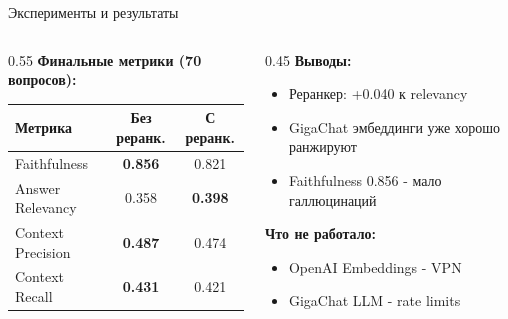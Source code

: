 \documentclass[aspectratio=169,12pt]{beamer}
\begin{document}
\begin{frame}{Эксперименты и результаты}

\begin{columns}
\begin{column}{0.55\textwidth}
\textbf{Финальные метрики (70 вопросов):}

\begin{table}
\centering
\begin{tabular}{lcc}
\toprule
Метрика & Без реранк. & С реранк. \\
\midrule
Faithfulness & \textbf{0.856} & 0.821 \\
Answer Relevancy & 0.358 & \textbf{0.398} \\
Context Precision & \textbf{0.487} & 0.474 \\
Context Recall & \textbf{0.431} & 0.421 \\
\bottomrule
\end{tabular}
\end{table}
\end{column}

\begin{column}{0.45\textwidth}
\textbf{Выводы:}
\begin{itemize}
    \item Реранкер: +0.040 к relevancy
    \item GigaChat эмбеддинги уже хорошо ранжируют
    \item Faithfulness 0.856 - мало галлюцинаций
\end{itemize}

\vspace{0.5em}
\textbf{Что не работало:}
\begin{itemize}
    \item OpenAI Embeddings - VPN
    \item GigaChat LLM - rate limits
\end{itemize}
\end{column}
\end{columns}

\end{frame}
\end{document}
